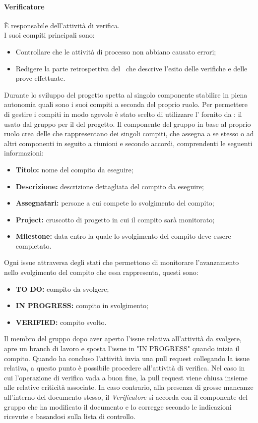 \paragraph*{Verificatore}
È responsabile dell'attività di verifica.\\
I suoi compiti principali sono:
\begin{itemize}
	\item Controllare che le attività di processo non abbiano causato errori;
	\item Redigere la parte retrospettiva del \PdQv\ che descrive l'esito delle verifiche e delle prove effettuate.
\end{itemize}

\label{GestioneCompiti}Durante lo sviluppo del progetto spetta al singolo componente stabilire in piena autonomia quali sono i suoi compiti a seconda del proprio ruolo.
Per permettere di gestire i compiti in modo agevole è stato scelto di utilizzare l' fornito da : il  usato dal gruppo per il  del progetto.
Il componente del gruppo in base al proprio ruolo crea delle  che rappresentano dei singoli compiti, che assegna a se stesso o ad altri componenti in seguito a riunioni e secondo accordi, comprendenti le seguenti informazioni:
\begin{itemize}
	\item \textbf{Titolo:} nome del compito da eseguire;
	\item \textbf{Descrizione:} descrizione dettagliata del compito da eseguire;
	\item \textbf{Assegnatari:} persone a cui compete lo svolgimento del compito;
	\item \textbf{Project:} cruscotto di progetto in cui il compito sarà monitorato;
	\item \textbf{Milestone:} data entro la quale lo svolgimento del compito deve essere completato.
\end{itemize}
Ogni issue attraversa degli stati che permettono di monitorare l'avanzamento nello svolgimento del compito che essa rappresenta, questi sono:
\begin{itemize}
	\item \textbf{TO DO:} compito da svolgere;
	\item \textbf{IN PROGRESS:} compito in svolgimento;
	\item \textbf{VERIFIED:} compito svolto.
\end{itemize}
Il membro del gruppo dopo aver aperto l'issue relativa all'attività da svolgere, apre un branch di lavoro e sposta l'issue in "IN PROGRESS" quando inizia il compito. Quando ha concluso l'attività invia una pull request collegando la issue relativa, a questo punto è possibile procedere all'attività di verifica. Nel caso in cui l'operazione di verifica vada a buon fine, la pull request viene chiusa insieme alle relative criticità associate. In caso contrario, alla presenza di grosse mancanze all'interno del documento stesso, il \textit{Verificatore} si accorda con il componente del gruppo che ha modificato il documento e lo corregge secondo le indicazioni ricevute e basandosi sulla lista di controllo.

